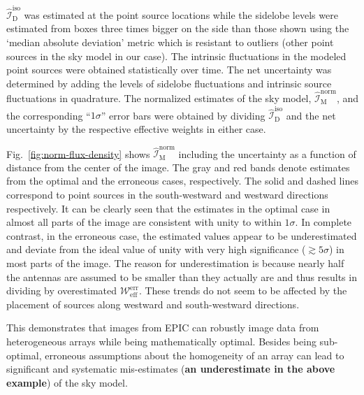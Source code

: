 \documentclass[a4paper,fleqn,usenatbib]{mnras}
\begin{document}
$\widehat{\mathcal{I}}_\textrm{D}^\textrm{iso}$ was estimated at the point source locations while the sidelobe levels were estimated from boxes three times bigger on the side than those shown using the `median absolute deviation' metric which is resistant to outliers (other point sources in the sky model in our case). The intrinsic fluctuations in the modeled point sources were obtained statistically over time. The net uncertainty was determined by adding the levels of sidelobe fluctuations and intrinsic source fluctuations in quadrature. The normalized estimates of the sky model, $\widehat{\mathcal{I}}_\textrm{M}^\textrm{norm}$, and the corresponding ``$1\sigma$'' error bars were obtained by dividing $\widehat{\mathcal{I}}_\textrm{D}^\textrm{iso}$ and the net uncertainty by the respective effective weights in either case. 

Fig.~\ref{fig:norm-flux-density} shows $\widehat{\mathcal{I}}_\textrm{M}^\textrm{norm}$ including the uncertainty as a function of distance from the center of the image. The gray and red bands denote estimates from the optimal and the erroneous cases, respectively. The solid and dashed lines correspond to point sources in the south-westward and westward directions respectively. It can be clearly seen that the estimates in the optimal case in almost all parts of the image are consistent with unity to within $1\sigma$. In complete contrast, in the erroneous case, the estimated values appear to be underestimated and deviate from the ideal value of unity with very high significance ($\gtrsim 5\sigma$) in most parts of the image. The reason for underestimation is because nearly half the antennas are assumed to be smaller than they actually are and thus results in dividing by overestimated $\mathcal{W}_\textrm{eff}^\textrm{err}$. These trends do not seem to be affected by the placement of sources along westward and south-westward directions. 

This demonstrates that images from EPIC can robustly image data from heterogeneous arrays while being mathematically optimal. Besides being sub-optimal, erroneous assumptions about the homogeneity of an array can lead to significant and systematic mis-estimates ({\bf an underestimate in the above example}) of the sky model.

\end{document}
